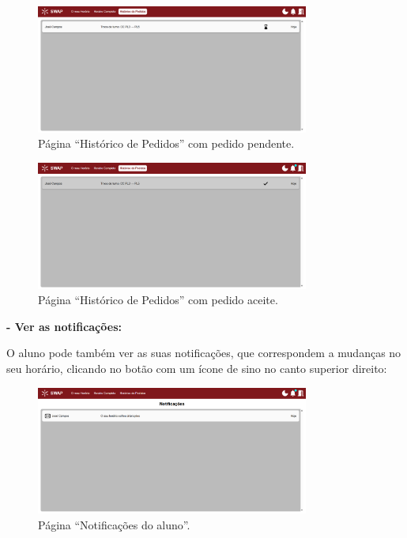 \documentclass[12pt, a4paper]{article}
\begin{document}
\begin{figure}[H]
    \centering
    \includegraphics[width=0.8\textwidth]{res/manual/historico_pedidos.png}
    \caption{Página ``Histórico de Pedidos'' com pedido pendente.}
    \label{historico_pedidos}
\end{figure}

\begin{figure}[H]
    \centering
    \includegraphics[width=0.8\textwidth]{res/manual/historico_pedidos_resolvido.png}
    \caption{Página ``Histórico de Pedidos'' com pedido aceite.}
    \label{historico_pedidos_resolvido}
\end{figure}

\textbf{- Ver as notificações:}

O aluno pode também ver as suas notificações, que correspondem a mudanças no seu horário, clicando
no botão com um ícone de sino no canto superior direito:

\begin{figure}[H]
    \centering
    \includegraphics[width=0.8\textwidth]{res/manual/notificacoes_aluno.png}
    \caption{Página ``Notificações do aluno''.}
    \label{notificacoes_aluno}
\end{figure}
\end{document}
